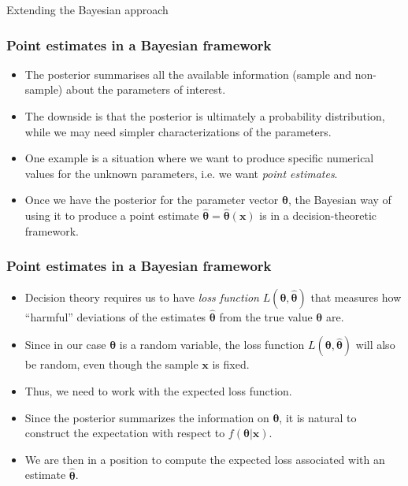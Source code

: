 \documentclass[10pt]{beamer}
\theoremstyle{definition}
\begin{document}
\begin{section}{Extending the Bayesian approach}
\begin{frame}[fragile]
\frametitle{Point estimates in a Bayesian framework}
\begin{itemize}\itemsep1em
\item The posterior summarises all the available information (sample and non-sample) about the parameters of interest.
\item The downside is that the posterior is ultimately a probability distribution, while we may need simpler characterizations of the parameters.
\item One example is a situation where we want to produce specific numerical values for the unknown parameters, i.e. we want \emph{point estimates}.
\item Once we have the posterior for the parameter vector $\boldsymbol{\theta}$, the Bayesian way of using it to produce a point estimate $\boldsymbol{\hat{\theta}}=\boldsymbol{\hat{\theta}}(\mathbf{x})$ is in a decision-theoretic framework.
\end{itemize}
\end{frame}

\begin{frame}[fragile]
\frametitle{Point estimates in a Bayesian framework}
\begin{itemize}\itemsep1em
\item Decision theory requires us to have \emph{loss function} $L(\boldsymbol{\theta},\boldsymbol{\hat{\theta}})$ that measures how ``harmful'' deviations of the estimates $\boldsymbol{\hat{\theta}}$ from the true value $\boldsymbol{\theta}$ are. 
\item Since in our case $\boldsymbol{\theta}$ is a random variable, the loss function $L(\boldsymbol{\theta},\boldsymbol{\hat{\theta}})$ will also be random, even though the sample $\mathbf{x}$ is fixed.
\item Thus, we need to work with the expected loss function.
\item Since the posterior summarizes the information on $\boldsymbol{\theta}$, it is natural to construct the expectation with respect to $ f(\boldsymbol{\theta}|\mathbf{x}) $.
\item We are then in a position to compute the expected loss associated with an estimate $\boldsymbol{\hat{\theta}}$.
\end{itemize}
\end{frame}


\end{section}
\end{document}
